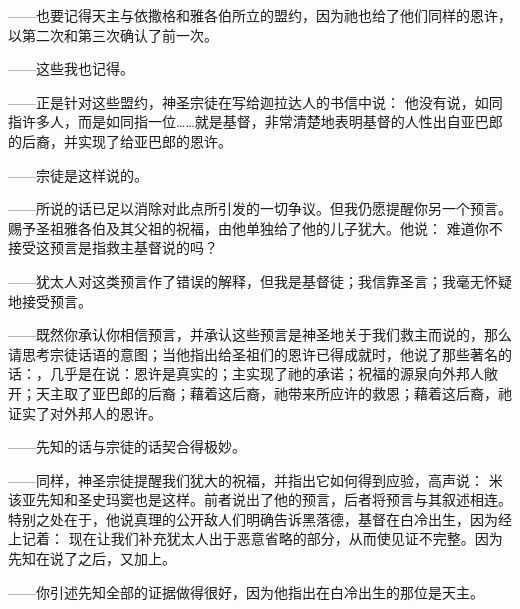——也要记得天主与依撒格和雅各伯所立的盟约，因为祂也给了他们同样的恩许，以第二次和第三次确认了前一次。\par

——这些我也记得。\par

——正是针对这些盟约，神圣宗徒在写给迦拉达人的书信中说： 他没有说，如同指许多人，而是如同指一位……就是基督，非常清楚地表明基督的人性出自亚巴郎的后裔，并实现了给亚巴郎的恩许。\par

——宗徒是这样说的。\par

——所说的话已足以消除对此点所引发的一切争议。但我仍愿提醒你另一个预言。赐予圣祖雅各伯及其父祖的祝福，由他单独给了他的儿子犹大。他说： 难道你不接受这预言是指救主基督说的吗？\par

——犹太人对这类预言作了错误的解释，但我是基督徒；我信靠圣言；我毫无怀疑地接受预言。\par

——既然你承认你相信预言，并承认这些预言是神圣地关于我们救主而说的，那么请思考宗徒话语的意图；当他指出给圣祖们的恩许已得成就时，他说了那些著名的话：，几乎是在说：恩许是真实的；主实现了祂的承诺；祝福的源泉向外邦人敞开；天主取了亚巴郎的后裔；藉着这后裔，祂带来所应许的救恩；藉着这后裔，祂证实了对外邦人的恩许。\par

——先知的话与宗徒的话契合得极妙。\par

——同样，神圣宗徒提醒我们犹大的祝福，并指出它如何得到应验，高声说： 米该亚先知和圣史玛窦也是这样。前者说出了他的预言，后者将预言与其叙述相连。特别之处在于，他说真理的公开敌人们明确告诉黑落德，基督在白冷出生，因为经上记着： 现在让我们补充犹太人出于恶意省略的部分，从而使见证不完整。因为先知在说了之后，又加上。\par

——你引述先知全部的证据做得很好，因为他指出在白冷出生的那位是天主。\par

